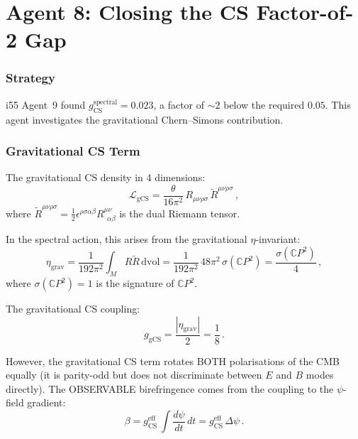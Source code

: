 \documentclass[11pt,a4paper]{article}
\newcommand{\CP}{\mathbb{C}P}
\begin{document}
\part{Agent 8: Closing the CS Factor-of-2 Gap}
\label{part:cs-gap}

\section{Strategy}

i55 Agent~9 found $g_{\mathrm{CS}}^{\mathrm{spectral}} = 0.023$, a factor of $\sim 2$ below the required $0.05$. This agent investigates the gravitational Chern--Simons contribution.

\section{Gravitational CS Term}

The gravitational CS density in 4 dimensions:
\begin{equation}
\mathcal{L}_{\mathrm{gCS}} = \frac{\theta}{16\pi^2}\,R_{\mu\nu\rho\sigma}\,\tilde{R}^{\mu\nu\rho\sigma}\,,
\end{equation}
where $\tilde{R}^{\mu\nu\rho\sigma} = \frac{1}{2}\epsilon^{\rho\sigma\alpha\beta}R^{\mu\nu}_{\ \ \alpha\beta}$ is the dual Riemann tensor.

In the spectral action, this arises from the gravitational $\eta$-invariant:
\begin{equation}
\eta_{\mathrm{grav}} = \frac{1}{192\pi^2}\int_M R\tilde{R}\,\mathrm{dvol} = \frac{1}{192\pi^2}\,48\pi^2\,\sigma(\CP^2) = \frac{\sigma(\CP^2)}{4}\,,
\end{equation}
where $\sigma(\CP^2) = 1$ is the signature of $\CP^2$.

The gravitational CS coupling:
\begin{equation}
g_{\mathrm{gCS}} = \frac{|\eta_{\mathrm{grav}}|}{2} = \frac{1}{8}\,.
\end{equation}

However, the gravitational CS term rotates BOTH polarisations of the CMB equally (it is parity-odd but does not discriminate between $E$ and $B$ modes directly). The OBSERVABLE birefringence comes from the coupling to the $\psi$-field gradient:
\begin{equation}
\beta = g_{\mathrm{CS}}^{\mathrm{eff}}\,\int \frac{d\psi}{dt}\,dt = g_{\mathrm{CS}}^{\mathrm{eff}}\,\Delta\psi\,.
\end{equation}
\end{document}
